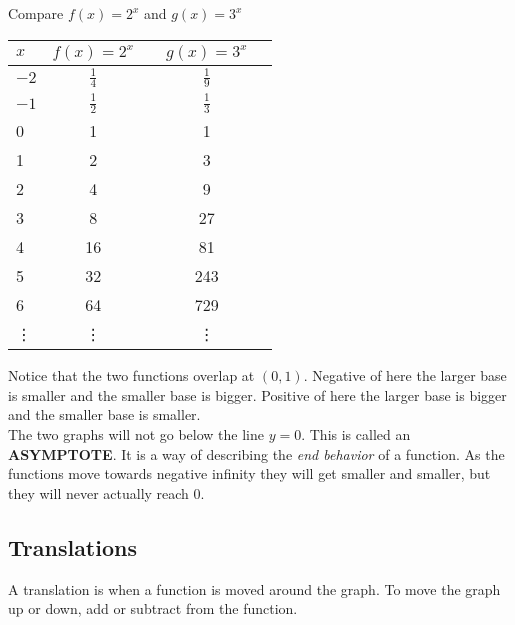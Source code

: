 \documentclass[12pt]{article}
\begin{document}
Compare $f(x)=2^x$ and $g(x)=3^x$

\begin{center}
\begin{tabular}{ l | c | c | c | c }
  \textbf{$x$} & $f(x)=2^x$ & \hspace{1cm} & $g(x)=3^x$ \\ \hline
  $-2$ & $\frac{1}{4}$ & & $\frac{1}{9}$\\ \hline
  $-1$ & $\frac{1}{2}$ & & $\frac{1}{3}$\\ \hline
  0  & 1 & & 1\\ \hline
  1  & 2 & & 3\\ \hline
  2  & 4 & & 9\\ \hline
  3  & 8 & & 27\\ \hline
  4  & 16 & & 81\\ \hline
  5  & 32 & & 243\\ \hline
  6  & 64 & & 729\\ \hline
  \vdots & \vdots & &\vdots
\end{tabular}
\end{center}

\begin{center}
\end{center}

Notice that the two functions overlap at $(0,1)$. Negative of here the larger base is smaller and the smaller base is bigger. Positive of here the larger base is bigger and the smaller base is smaller.\\

The two graphs will not go below the line $y=0$. This is called an \textbf{ASYMPTOTE}. It is a way of describing the \textit{end behavior} of a function. As the functions move towards negative infinity they will get smaller and smaller,  but they will never actually reach 0.\\

\pagebreak

\subsection*{Translations}

A translation is when a function is moved around the graph. To move the graph up or down, add or subtract from the function.

\begin{center}
\end{center}
\end{document}
